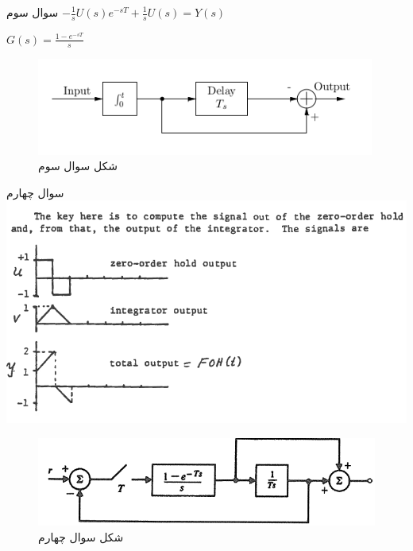 \documentclass{article}
\begin{document}
    \begin{problem}{سوال سوم}
    	\raggedleft
    	$-\frac{1}{s}U(s)e^{-sT} + \frac{1}{s}U(s) = Y(s)$
    	
    	
    	$G(s) = \frac{1-e^{-sT}}{s}$ 
    	
    	
    \end{problem}
    \begin{figure}[htbp]
    	\centering
    	\includegraphics{Second Series/4.png}
    	\caption{شکل سوال سوم}
    \end{figure}
    
    
    \begin{problem}{سوال چهارم}
    	\includegraphics[width=\linewidth]{Second Series/17.png}
    	
    	
    \end{problem}
    \begin{figure}[htbp]
    	\includegraphics[width=\linewidth]{Second Series/5.png}
    	\caption{شکل سوال چهارم}
    \end{figure}
    
\end{document}
